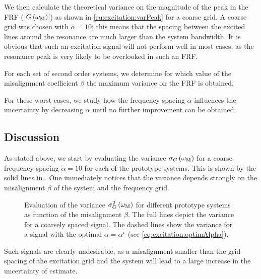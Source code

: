   We then calculate the theoretical variance on the magnitude of the peak in the \gls{FRF} ($\left| G\left( \omega_{\mathrm{M}} \right) \right|$) as shown in \eqref{eq:excitation:varPeak} for a coarse grid.
  A coarse grid was chosen with $\tilde{\alpha} = 10$; this means that the spacing between the excited lines around the resonance are much larger than the system bandwidth.
  It is obvious that such an excitation signal will not perform well in most cases, as the resonance peak is very likely to be overlooked in such an \gls{FRF}.
  
  For each set of second order systems, we determine for which value of the misalignment coefficient $\beta$ the maximum variance on the FRF is obtained.
  
  For these worst cases, we study how the frequency spacing $\alpha$ influences the uncertainty by decreasing $\alpha$ until no further improvement can be obtained.

  \subsection{Discussion} 
  \label{sec:excitation:bestFrequencyResolution}
  As stated above, we start by evaluating the variance $\sigma_G\left( \omega_{\mathrm{M}}\right)$ for a coarse frequency spacing $\tilde{\alpha} = 10$ for each of the prototype systems.
  This is shown by the solid lines in .
  One immediately notices that the variance depends strongly on the misalignment $\beta$ of the system and the frequency grid.
  
  \begin{figure}
    \centering
      \setlength{}
      \setlength\figureheight{0.68\figurewidth}
    
    \caption[Variance $\sigma_G^2\left( \wM \right)$ as a function of the grid misalignment $\beta$.]{Evaluation of the variance $\sigma_G^2\left( \wM \right) $ for different prototype systems as function of the misalignment $\beta$.
             The full lines depict the variance for a coarsely spaced signal.
             The dashed lines show the variance for a signal with the optimal $\alpha = \alpha^{\star}$ (see \eqref{eq:excitation:optimAlpha}).}
    \label{fig:excitation:worstCaseBeta}
  \end{figure}

  Such signals are clearly undesirable, as a misalignment smaller than the grid spacing of the excitation grid and the system will lead to a large increase in the uncertainty of estimate.
  
